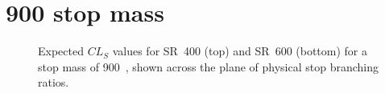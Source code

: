 \FloatBarrier

\newpage
\section{900 \texorpdfstring{\GeV}{GeV} stop mass}

\begin{figure}[ht]
  \centering
  \caption{
    Expected
    $CL_S$ values for SR~400 (top) and SR~600 (bottom) for a stop mass of
    900~\GeV,
    shown across the plane of physical stop branching ratios.
  }
\end{figure}

